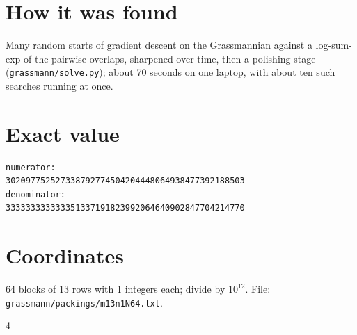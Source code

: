 \documentclass[11pt,a4paper]{article}
\begin{document}
\section{How it was found}
Many random starts of gradient descent on the Grassmannian against a log-sum-exp of the pairwise overlaps, sharpened over time, then a polishing stage (\texttt{grassmann/solve.py}); about 70 seconds on one laptop, with about ten such searches running at once.


\appendix
\section{Exact value}
{\small
\begin{verbatim}
numerator:
302097752527338792774504204448064938477392188503
denominator:
333333333333351337191823992064640902847704214770
\end{verbatim}}

\section{Coordinates}
64 blocks of 13 rows with 1 integers each; divide by $10^{12}$. File: \texttt{grassmann/packings/m13n1N64.txt}.
{\tiny
\begin{multicols}{4}
\end{multicols}}
\end{document}
